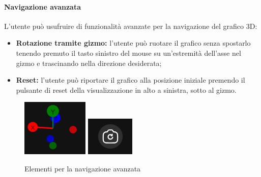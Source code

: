 \paragraph{Navigazione avanzata}
L'utente può usufruire di funzionalità avanzate per la navigazione del grafico
3D:
\begin{itemize}
    \item \textbf{Rotazione tramite gizmo:} l'utente può ruotare il grafico
          senza spostarlo tenendo premuto il tasto sinistro del mouse su un'estremità
          dell'asse nel gizmo e trascinando nella direzione desiderata;
    \item \textbf{Reset:} l'utente può riportare il grafico alla posizione
          iniziale premendo il pulsante di reset della
          visualizzazione in alto a sinistra, sotto al gizmo.
\end{itemize}
\begin{figure}[ht!]
    \centering
    \includegraphics[scale=0.6]{template/images/gizmo.png}
    \hspace{1cm}
    \includegraphics[scale=0.6]{template/images/resetcam.png}
    \caption{Elementi per la navigazione avanzata}
\end{figure}

